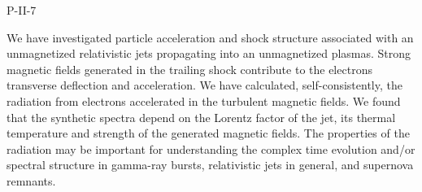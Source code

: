 P-II-7


\bigskip



\bigskip

\noindent We have investigated particle acceleration and shock structure associated with an unmagnetized relativistic jets propagating into an unmagnetized plasmas. Strong magnetic fields generated in the trailing shock contribute to the electrons transverse deflection and acceleration. We have calculated, self-consistently, the radiation from electrons accelerated in the turbulent magnetic fields. We found that the synthetic spectra depend on the Lorentz factor of the jet, its thermal temperature and strength of the generated magnetic fields. The properties of the radiation may be important for understanding the complex time evolution and/or spectral structure in gamma-ray bursts, relativistic jets in general, and supernova remnants.

